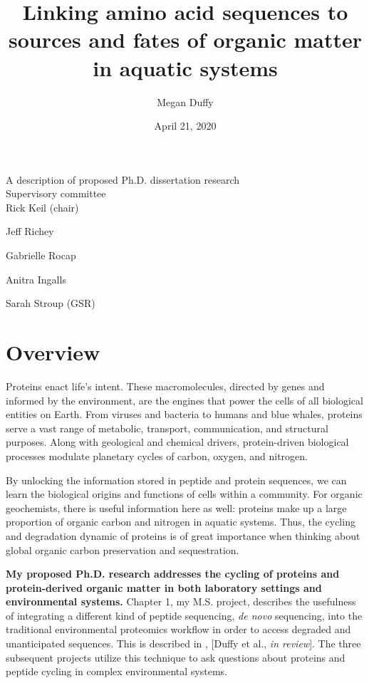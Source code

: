\documentclass[12pt, letterpaper, twoside]{article}
\title{Linking amino acid sequences to sources and fates of organic matter in aquatic systems}
\author{Megan Duffy}
\date{April 21, 2020}
\begin{document}
	
	\begin{titlepage}
		
		\maketitle
		\begin{center}
			A description of proposed Ph.D. dissertation research \\
			\bigskip
			\bigskip
			Supervisory committee \\
			\bigskip
			Rick Keil (chair) 
			
			Jeff Richey 
			
			Gabrielle Rocap 
			
			Anitra Ingalls 
			
			Sarah Stroup (GSR)
		\end{center}
		
	\end{titlepage}
	

\newpage

\tableofcontents{}

\newpage

\section*{Overview}

Proteins enact life’s intent. These macromolecules, directed by genes and informed by the environment, are the engines that power the cells of all biological entities on Earth. From viruses and bacteria to humans and blue whales, proteins serve a vast range of metabolic, transport, communication, and structural purposes. Along with geological and chemical drivers, protein-driven biological processes modulate planetary cycles of carbon, oxygen, and nitrogen.

By unlocking the information stored in peptide and protein sequences, we can learn the biological origins and functions of cells within a community. For organic geochemists, there is useful information here as well: proteins make up a large proportion of organic carbon and nitrogen in aquatic systems. Thus, the cycling and degradation dynamic of proteins is of great importance when thinking about global organic carbon preservation and sequestration. 

\textbf{My proposed Ph.D. research addresses the cycling of proteins and protein-derived organic matter in both laboratory settings and environmental systems.} Chapter 1, my M.S. project, describes the usefulness of integrating a different kind of peptide sequencing, \textit{de novo} sequencing, into the traditional environmental proteomics workflow in order to access degraded and unanticipated sequences. This is described in , [Duffy et al., \textit{in review}]. The three subsequent projects utilize this technique to ask questions about proteins and peptide cycling in complex environmental systems. 
\end{document}
